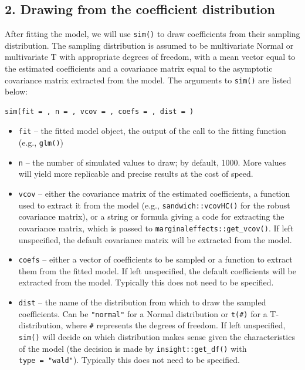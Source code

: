 \subsection{2. Drawing from the coefficient distribution}\label{drawing-from-the-coefficient-distribution}
After fitting the model, we will use \texttt{sim()} to draw coefficients from their sampling distribution. The sampling distribution is assumed to be multivariate Normal or multivariate T with appropriate degrees of freedom, with a mean vector equal to the estimated coefficients and a covariance matrix equal to the asymptotic covariance matrix extracted from the model. The arguments to \texttt{sim()} are listed below:
\begin{verbatim}
sim(fit = , n = , vcov = , coefs = , dist = )
\end{verbatim}
\begin{itemize}
\item
  \texttt{fit} -- the fitted model object, the output of the call to the fitting function (e.g., \texttt{glm()})
\item
  \texttt{n} -- the number of simulated values to draw; by default, 1000. More values will yield more replicable and precise results at the cost of speed.
\item
  \texttt{vcov} -- either the covariance matrix of the estimated coefficients, a function used to extract it from the model (e.g., \texttt{sandwich::vcovHC()} for the robust covariance matrix), or a string or formula giving a code for extracting the covariance matrix, which is passed to \texttt{marginaleffects::get\_vcov()}. If left unspecified, the default covariance matrix will be extracted from the model.
\item
  \texttt{coefs} -- either a vector of coefficients to be sampled or a function to extract them from the fitted model. If left unspecified, the default coefficients will be extracted from the model. Typically this does not need to be specified.
\item
  \texttt{dist} -- the name of the distribution from which to draw the sampled coefficients. Can be \texttt{"normal"} for a Normal distribution or \texttt{t(\#)} for a T-distribution, where \texttt{\#} represents the degrees of freedom. If left unspecified, \texttt{sim()} will decide on which distribution makes sense given the characteristics of the model (the decision is made by \texttt{insight::get\_df()} with \texttt{type\ =\ "wald"}). Typically this does not need to be specified.
\end{itemize}
